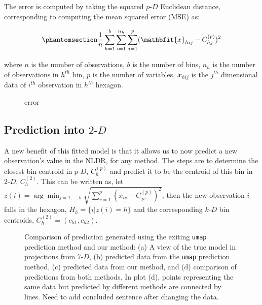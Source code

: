 \documentclass[
  12pt]{article}
\newcommand\pD{$p\text{-}D$}
\newcommand\kD{$k\text{-}D$}
\newcommand\gD{$2\text{-}D$}
\begin{document}
The error is computed by taking the squared \pD{} Euclidean distance,
corresponding to computing the mean squared error (MSE) as:

\begin{equation}\phantomsection\label{eq-equation1}{\frac{1}{n}\sum_{h = 1}^{b}\sum_{i = 1}^{n_h}\sum_{j = 1}^{p} (\mathbfit{x}_{hij} - C^{(p)}_{hj})^2}\end{equation}

where \(n\) is the number of observations, \(b\) is the number of bins,
\(n_h\) is the number of observations in \(h^{th}\) bin, \(p\) is the
number of variables, \(\mathbfit{x}_{hij}\) is the \(j^{th}\)
dimensional data of \(i^{th}\) observation in \(h^{th}\) hexagon.

\begin{figure}[H]


\caption{\label{fig-p-d-error-in-2d-two-curvy}error}

\end{figure}%

\subsection{\texorpdfstring{Prediction into
\gD{}}{Prediction into }}\label{prediction-into}

A new benefit of this fitted model is that it allows us to now predict a
new observation's value in the NLDR, for any method. The steps are to
determine the closest bin centroid in \pD{}, \(C^{(p)}_{h}\) and predict
it to be the centroid of this bin in \gD{}, \(C^{(2)}_{h}\). This can be
written as, let
\(z(i) = \arg\min_{j = 1, \dots, b} \sqrt{\sum_{v=1}^{p}(x_{iv} - C^{(p)}_{jv})^2}\),
then the new observation \(i\) falls in the hexagon,
\(H_h = \{i| z(i) = h\}\) and the corresponding \kD{} bin centroids,
\(C_{h}^{(2)} = (c_{h1}, c_{h2})\).

\begin{figure}[H]


\caption{\label{fig-predict-two-curvy}Comparison of prediction generated
using the exiting \texttt{umap} prediction method and our method: (a) A
view of the true model in projections from \(7\text{-}D\), (b) predicted
data from the \texttt{umap} prediction method, (c) predicted data from
our method, and (d) comparison of predictions from both methods. In plot
(d), points representing the same data but predicted by different
methods are connected by lines. Need to add concluded sentence after
changing the data.}

\end{figure}%
\end{document}
